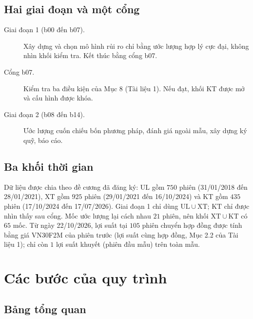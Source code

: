 \documentclass[12pt,a4paper]{article}
\theoremstyle{remark}
\newcommand{\UL}{\mathrm{UL}}
\newcommand{\XT}{\mathrm{XT}}
\newcommand{\KT}{\mathrm{KT}}
\begin{document}
\subsection{Hai giai đoạn và một cổng}

\begin{description}
\item[Giai đoạn 1 (b00 đến b07).] Xây dựng và chọn mô hình rủi ro chỉ bằng ước lượng hợp lý cực đại, không nhìn khối kiểm tra. Kết thúc bằng cổng b07.
\item[Cổng b07.] Kiểm tra ba điều kiện của Mục 8 (Tài liệu 1). Nếu đạt, khối $\KT$ được mở và cấu hình được khóa.
\item[Giai đoạn 2 (b08 đến b14).] Ước lượng cuốn chiếu bốn phương pháp, đánh giá ngoài mẫu, xây dựng ký quỹ, báo cáo.
\end{description}

\subsection{Ba khối thời gian}

Dữ liệu được chia theo đề cương đã đăng ký: $\UL$ gồm $750$ phiên (31/01/2018 đến 28/01/2021), $\XT$ gồm $925$ phiên (29/01/2021 đến 16/10/2024) và $\KT$ gồm $435$ phiên (17/10/2024 đến 17/07/2026). Giai đoạn 1 chỉ dùng $\UL\cup\XT$; $\KT$ chỉ được nhìn thấy sau cổng. Mốc ước lượng lại cách nhau $21$ phiên, nên khối $\XT\cup\KT$ có $65$ mốc. Từ ngày 22/10/2026, lợi suất tại $105$ phiên chuyển hợp đồng được tính bằng giá VN30F2M của phiên trước (lợi suất cùng hợp đồng, Mục 2.2 của Tài liệu 1); chỉ còn $1$ lợi suất khuyết (phiên đầu mẫu) trên toàn mẫu.

\section{Các bước của quy trình}

\subsection{Bảng tổng quan}
\end{document}
